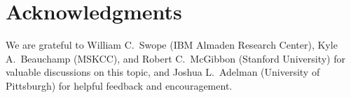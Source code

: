 \documentclass[aps,pre,twocolumn,nofootinbib,superscriptaddress,linenumbers,11point]{revtex4-1}
\begin{document}

\section*{Acknowledgments}

We are grateful to William C.~Swope (IBM Almaden Research Center), Kyle A.~Beauchamp (MSKCC), and Robert C.~McGibbon (Stanford University) for valuable discussions on this topic, and Joshua L.~Adelman (University of Pittsburgh) for helpful feedback and encouragement.


 

\end{document}
